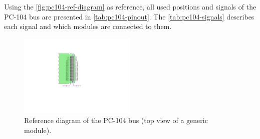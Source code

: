 Using the \autoref{fig:pc104-ref-diagram} as reference, all used positions and signals of the PC-104 bus are presented in \autoref{tab:pc104-pinout}. The \autoref{tab:pc104-signals} describes each signal and which modules are connected to them.

\begin{figure}[!htb]
    \begin{center}
        \includegraphics[width=0.5\textwidth]{figures/pc104-diagram}
        \caption{Reference diagram of the PC-104 bus (top view of a generic module).}
        \label{fig:pc104-ref-diagram}
    \end{center}
\end{figure}

